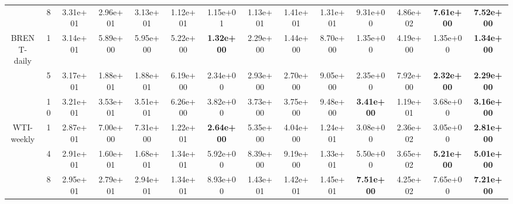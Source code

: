 \begin{table*}[!t]
{\begin{tabular}{cccccccccccccc}
                                     & 8                  & 3.31e+01                        & 2.96e+01                     & 3.13e+01                   & 1.12e+01                     & 1.15e+01          & 1.13e+01          & 1.41e+01 & 1.31e+01 & 9.31e+00          & 4.86e+02 & \textbf{7.61e+00} & \textbf{7.52e+00}\s \\ \cmidrule(l){2-14}
            \multirowcell{3}{BRENT-\\daily} & 1                  & 3.14e+01                        & 5.89e+00                     & 5.95e+00                   & 5.22e+00                     & \textbf{1.32e+00}\s & 2.29e+00          & 1.44e+00 & 8.70e+00 & 1.35e+00          & 4.19e+00 & 1.35e+00          & \textbf{1.34e+00} \\ \cmidrule(l){3-14}
                                     & 5                  & 3.17e+01                        & 1.88e+01                     & 1.88e+01                   & 6.19e+00                     & 2.34e+00          & 2.93e+00          & 2.70e+00 & 9.05e+00 & 2.35e+00          & 7.92e+00 & \textbf{2.32e+00} & \textbf{2.29e+00}\s \\ \cmidrule(l){3-14}
                                     & 10                 & 3.21e+01                        & 3.53e+01                     & 3.51e+01                   & 6.26e+00                     & 3.82e+00          & 3.73e+00          & 3.75e+00 & 9.48e+00 & \textbf{3.41e+00} & 1.19e+01 & 3.68e+00          & \textbf{3.16e+00}\s \\ \cmidrule(l){2-14}
            \multirowcell{3}{WTI-\\weekly}   & 1                  & 2.87e+01                        & 7.00e+00                     & 7.31e+00                   & 1.22e+01                     & \textbf{2.64e+00}\s & 5.35e+00          & 4.04e+00 & 1.24e+01 & 3.08e+00          & 2.36e+02 & 3.05e+00          & \textbf{2.81e+00} \\ \cmidrule(l){3-14}
                                     & 4                  & 2.91e+01                        & 1.60e+01                     & 1.68e+01                   & 1.34e+01                     & 5.92e+00          & 8.39e+00          & 9.19e+00 & 1.33e+01 & 5.50e+00          & 3.65e+02 & \textbf{5.21e+00} & \textbf{5.01e+00}\s \\ \cmidrule(l){3-14}
                                     & 8                  & 2.95e+01                        & 2.79e+01                     & 2.94e+01                   & 1.34e+01                     & 8.93e+00          & 1.43e+01          & 1.42e+01 & 1.45e+01 & \textbf{7.51e+00} & 4.25e+02 & 7.65e+00          & \textbf{7.21e+00}\s \\ \cmidrule(l){2-14}

\end{tabular}}
\end{table*}
